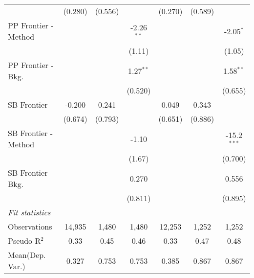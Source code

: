 \begin{tabular}{lcccccc}
                        & (0.280)        & (0.556) &              & (0.270)        & (0.589) &   \\   
   PP Frontier - Method &                &         & -2.26$^{**}$ &                &         & -2.05$^{*}$\\   
                        &                &         & (1.11)       &                &         & (1.05)\\   
   PP Frontier - Bkg.   &                &         & 1.27$^{**}$  &                &         & 1.58$^{**}$\\   
                        &                &         & (0.520)      &                &         & (0.655)\\   
   SB Frontier          & -0.200         & 0.241   &              & 0.049          & 0.343   &   \\   
                        & (0.674)        & (0.793) &              & (0.651)        & (0.886) &   \\   
   SB Frontier - Method &                &         & -1.10        &                &         & -15.2$^{***}$\\   
                        &                &         & (1.67)       &                &         & (0.700)\\   
   SB Frontier - Bkg.   &                &         & 0.270        &                &         & 0.556\\   
                        &                &         & (0.811)      &                &         & (0.895)\\   
   \midrule
   \emph{Fit statistics}\\
   Observations         & 14,935         & 1,480   & 1,480        & 12,253         & 1,252   & 1,252\\  
   Pseudo R$^2$         & 0.33           & 0.45    & 0.46         & 0.33           & 0.47    & 0.48\\  
Mean(Dep. Var.) & 0.327 & 0.753 & 0.753 & 0.385 & 0.867 & 0.867 \\
   

\end{tabular}
